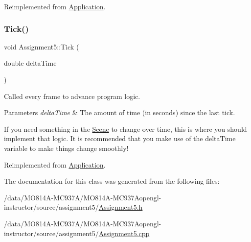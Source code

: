 Reimplemented from \hyperlink{class_application_aa8e8017ef8dd86293c96d0645e66d440}{Application}.

\hypertarget{class_assignment5_a34cdf7bc962c3a0e3959c77a24c54d79}{}\label{class_assignment5_a34cdf7bc962c3a0e3959c77a24c54d79}
\subsubsection{\texorpdfstring{Tick()}{Tick()}}
{\footnotesize\ttfamily void Assignment5\+::\+Tick (\begin{DoxyParamCaption}\item[{double}]{delta\+Time }\end{DoxyParamCaption})\hspace{0.3cm}{\ttfamily [virtual]}}



Called every frame to advance program logic.


\begin{DoxyParams}{Parameters}
{\em delta\+Time} & The amount of time (in seconds) since the last tick.\\
\hline
\end{DoxyParams}
If you need something in the \hyperlink{class_scene}{Scene} to change over time, this is where you should implement that logic. It is recommended that you make use of the delta\+Time variable to make things change smoothly!

Reimplemented from \hyperlink{class_application_a0800afd5651153d31fa775a8048d14dd}{Application}.



The documentation for this class was generated from the following files\+:\begin{DoxyCompactItemize}
\item
/data/MO814A-MC937A/MO814A-MC937Aopengl-\/instructor/source/assignment5/\hyperlink{_assignment5_8h}{Assignment5.\+h}\item
/data/MO814A-MC937A/MO814A-MC937Aopengl-\/instructor/source/assignment5/\hyperlink{_assignment5_8cpp}{Assignment5.\+cpp}\end{DoxyCompactItemize}
